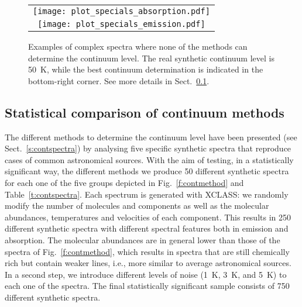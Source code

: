 \documentclass{aa}
\begin{document}
\begin{figure}[t]
\begin{center}
\begin{tabular}[b]{c}
        \texttt{[image: plot\_specials\_absorption.pdf]} \\
        \texttt{[image: plot\_specials\_emission.pdf]} \\
\end{tabular}
\caption{Examples of complex spectra where none of the methods can determine the continuum level. The real synthetic continuum level is 50~K, while the best continuum determination is indicated in the bottom-right corner. See more details in Sect.~\ref{s:statistics}.}
\label{f:special}
\end{center}
\end{figure}

\subsection{Statistical comparison of continuum methods}\label{s:statistics}

The different methods to determine the continuum level have been presented (see Sect.~\ref{s:contspectra}) by analysing five specific synthetic spectra that reproduce cases of common astronomical sources. With the aim of testing, in a statistically significant way, the different methods we produce 50 different synthetic spectra for each one of the five groups depicted in Fig.~\ref{f:contmethod} and Table~\ref{t:contspectra}. Each spectrum is generated with XCLASS: we randomly modify the number of molecules and components as well as the molecular abundances, temperatures and velocities of each component. This results in 250 different synthetic spectra with different spectral features both in emission and absorption. The molecular abundances are in general lower than those of the spectra of Fig.~\ref{f:contmethod}, which results in spectra that are still chemically rich but contain weaker lines, i.e., more similar to average astronomical sources. In a second step, we introduce different levels of noise (1~K, 3~K, and 5~K) to each one of the spectra. The final statistically significant sample consists of 750 different synthetic spectra.
\end{document}
